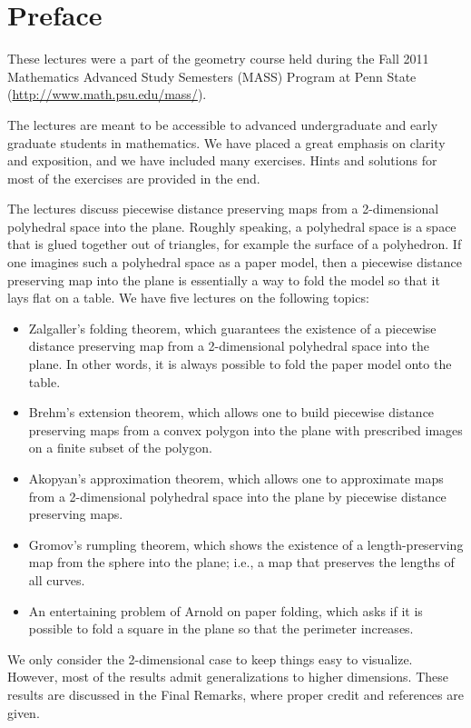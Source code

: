 \chapter*{Preface}
These lectures were a part of the geometry course held during the Fall 2011 Mathematics Advanced Study Semesters (MASS) Program at Penn State (\url{http://www.math.psu.edu/mass/}).

The lectures are meant to be accessible to advanced undergraduate and early graduate students in mathematics.  
We have placed a great emphasis on clarity and exposition, and we have included many exercises.  Hints and solutions for most of the exercises are provided in the end. 

The lectures discuss piecewise distance preserving maps from a 2-dimensional polyhedral space into the plane.  Roughly speaking, a polyhedral space is a space that is glued together out of triangles, for example the surface of a polyhedron.  If one imagines such a polyhedral space as a paper model, then a piecewise distance preserving map into the plane is essentially a way to fold the model so that it lays flat on a table. 
We have five lectures on the following topics:

\begin{itemize}
\item Zalgaller's folding theorem, which guarantees the existence of a piecewise distance preserving map from a 2-dimensional polyhedral space into the plane.  In other words, it is always possible to fold the paper model onto the table.
\item Brehm's extension theorem, which allows one to build piecewise distance preserving maps from a convex polygon into the plane with prescribed images on a finite subset of the polygon.
\item Akopyan's approximation theorem, which allows one to approximate  maps from a 2-dimensional polyhedral space into the plane by piecewise distance preserving maps.
\item Gromov's rumpling theorem, which shows the existence of a length-preserving map from the sphere into the plane; 
i.e., a map that preserves the lengths of all curves.
\item An entertaining problem of Arnold on paper folding, which asks if it is possible to fold a square in the plane so that the perimeter increases.
\end{itemize}

We only consider the 2-dimensional case to keep things easy to visualize.
However, 
most of the results admit generalizations to higher dimensions.
These results are discussed in the Final Remarks, where proper credit and references are given.

